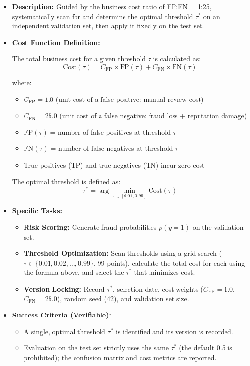 \documentclass[sigplan,screen]{acmart}
\begin{document}
\begin{itemize}
\item \textbf{Description:} Guided by the business cost ratio of FP:FN = 1:25, systematically scan for and determine the optimal threshold $\tau^*$ on an independent validation set, then apply it fixedly on the test set.

\item \textbf{Cost Function Definition:}

The total business cost for a given threshold $\tau$ is calculated as:
\begin{equation}
\text{Cost}(\tau) = C_{\text{FP}} \times \text{FP}(\tau) + C_{\text{FN}} \times \text{FN}(\tau)
\end{equation}

where:
\begin{itemize}
\item $C_{\text{FP}} = 1.0$ (unit cost of a false positive: manual review cost)
\item $C_{\text{FN}} = 25.0$ (unit cost of a false negative: fraud loss + reputation damage)
\item $\text{FP}(\tau)$ = number of false positives at threshold $\tau$
\item $\text{FN}(\tau)$ = number of false negatives at threshold $\tau$
\item True positives (TP) and true negatives (TN) incur zero cost
\end{itemize}

The optimal threshold is defined as:
\begin{equation}
\tau^* = \arg\min_{\tau \in [0.01, 0.99]} \text{Cost}(\tau)
\end{equation}

\item \textbf{Specific Tasks:}
\begin{itemize}
\item \textbf{Risk Scoring:} Generate fraud probabilities $p(y=1)$ on the validation set.
\item \textbf{Threshold Optimization:} Scan thresholds using a grid search ($\tau \in \{0.01, 0.02, \ldots, 0.99\}$, 99 points), calculate the total cost for each using the formula above, and select the $\tau^*$ that minimizes cost.
\item \textbf{Version Locking:} Record $\tau^*$, selection date, cost weights ($C_{\text{FP}}=1.0$, $C_{\text{FN}}=25.0$), random seed (42), and validation set size.
\end{itemize}
\item \textbf{Success Criteria (Verifiable):}
\begin{itemize}
\item A single, optimal threshold $\tau^*$ is identified and its version is recorded.
\item Evaluation on the test set strictly uses the same $\tau^*$ (the default 0.5 is prohibited); the confusion matrix and cost metrics are reported.
\end{itemize}
\end{itemize}
\end{document}
